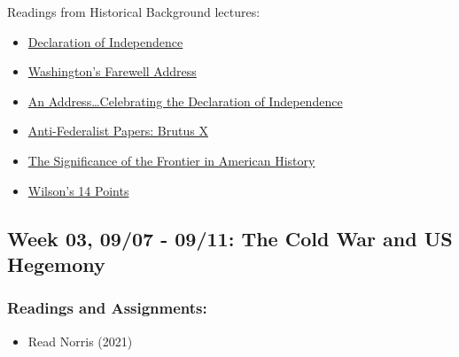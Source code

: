 \documentclass[
  letterpaper,
  DIV=11,
  numbers=noendperiod]{scrartcl}
\providecommand{\tightlist}{%
  \setlength{\itemsep}{0pt}\setlength{\parskip}{0pt}}
\begin{document}
\begin{tcolorbox}[enhanced jigsaw, arc=.35mm, bottomrule=.15mm, bottomtitle=1mm, breakable, colback=white, colbacktitle=quarto-callout-important-color!10!white, colframe=quarto-callout-important-color-frame, coltitle=black, left=2mm, leftrule=.75mm, opacityback=0, opacitybacktitle=0.6, rightrule=.15mm, title=\textcolor{quarto-callout-important-color}{\faExclamation}\hspace{0.5em}{\textbf{Friday 09/04: Discussion Day}}, titlerule=0mm, toprule=.15mm, toptitle=1mm]

Readings from Historical Background lectures:

\begin{itemize}
\tightlist
\item
  \href{https://www.archives.gov/founding-docs/declaration-transcript}{Declaration
  of Independence}
\item
  \href{https://www.presidency.ucsb.edu/documents/farewell-address}{Washington's
  Farewell Address}
\item
  \href{https://teachingamericanhistory.org/document/speech-on-independence-day/}{An
  Address\ldots Celebrating the Declaration of Independence}
\item
  \href{https://teachingamericanhistory.org/document/brutus-x/}{Anti-Federalist
  Papers: Brutus X}
\item
  \href{https://www.usmcu.edu/Portals/218/Turner\%20Thesis\%2C\%20Frederick\%20Jackson\%20Turner.pdf}{The
  Significance of the Frontier in American History}
\item
  \href{https://www.archives.gov/milestone-documents/president-woodrow-wilsons-14-points}{Wilson's
  14 Points}
\end{itemize}

\end{tcolorbox}

\subsection{Week 03, 09/07 - 09/11: The Cold War and US
Hegemony}\label{week-03-0907---0911-the-cold-war-and-us-hegemony}

\subsubsection{Readings and
Assignments:}\label{readings-and-assignments-2}

\begin{itemize}
\tightlist
\item
  Read Norris (2021)
\end{itemize}
\end{document}

